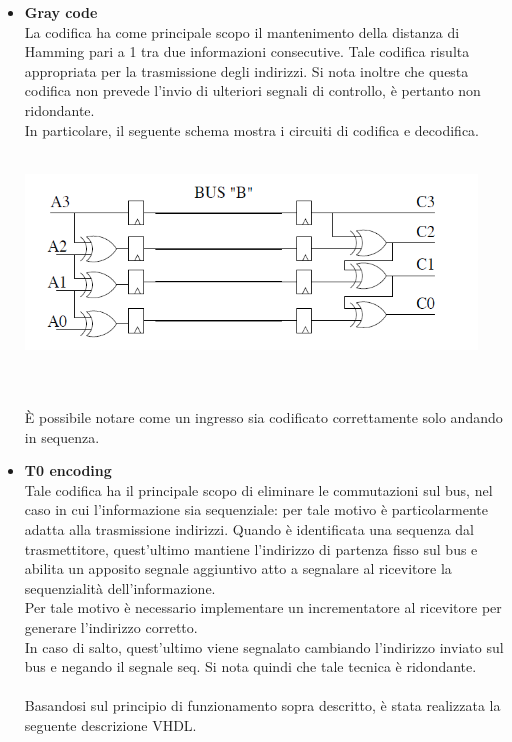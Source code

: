 \documentclass[11pt,  english, makeidx, a4paper, titlepage, oneside]{book}
\newenvironment{listato}{\footnotesize} {\normalsize }
\begin{document}
\begin{itemize}
\\\\
\item \textbf{Gray code}
\\
La codifica ha come principale scopo il mantenimento della distanza di Hamming pari a 1 tra due informazioni consecutive. Tale codifica risulta appropriata per la trasmissione degli indirizzi. Si nota inoltre che questa codifica non prevede l'invio di ulteriori segnali di controllo, è pertanto non ridondante.
\\
In particolare, il seguente schema mostra i circuiti di codifica e decodifica.
\\\\
\centerline{\includegraphics[width=12cm]{./img/Lab_4/gray.png}}
\\\\
È possibile notare come un ingresso sia codificato correttamente solo andando in sequenza.
\item \textbf{T0 encoding}
\\
Tale codifica ha il principale scopo di eliminare le commutazioni sul bus, nel caso in cui l'informazione sia sequenziale: per tale motivo è particolarmente adatta alla trasmissione indirizzi. Quando è identificata una sequenza dal trasmettitore, quest'ultimo mantiene l'indirizzo di partenza fisso sul bus e abilita un apposito segnale aggiuntivo atto a segnalare al ricevitore la sequenzialità dell'informazione.
\\
Per tale motivo è necessario implementare un incrementatore al ricevitore per generare l'indirizzo corretto.
\\
In caso di salto, quest'ultimo viene segnalato cambiando l'indirizzo inviato sul bus e negando il segnale seq.
Si nota quindi che tale tecnica è ridondante.
\\\\
Basandosi sul principio di funzionamento sopra descritto, è stata realizzata la seguente descrizione VHDL.
\begin{center}
\begin{listato}
	\centerline{}
\end{listato}
\end{center}
\end{itemize}
\end{document}
